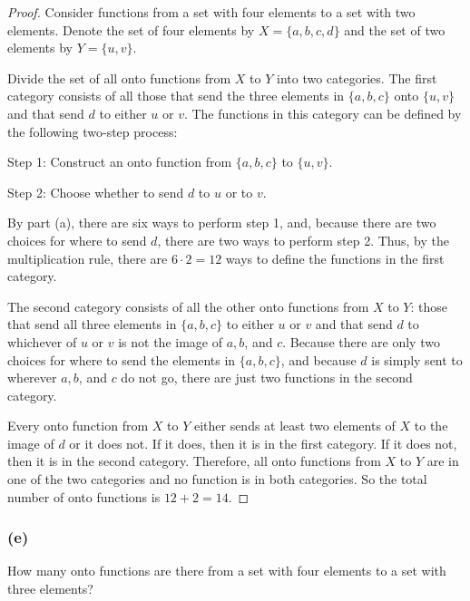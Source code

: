 \documentclass[14pt]{extarticle}
\newcommand{\cy}{\color{cyan}}
\begin{document}
\begin{proof}
     Consider functions from a set with four elements to a set with two elements. Denote the set of four elements by \(X =
     \{a, b, c, d\}\) and the set of two elements by \(Y = \{u, v\}\).

     Divide the set of all onto functions from \(X\) to \(Y\) into two categories. The first category consists of all those that
     send the three elements in \(\{a, b, c\}\) onto \(\{u, v\}\) and that send \(d\) to either \(u\) or \(v\). The functions in
     this category can be defined by the following two-step process:

     {\cy Step 1:} Construct an onto function from \(\{a, b, c\}\) to \(\{u, v\}\).

          {\cy Step 2:} Choose whether to send \(d\) to \(u\) or to \(v\).

     By part (a), there are six ways to perform step 1, and, because there are two choices for where to send \(d\), there
     are two ways to perform step 2. Thus, by the multiplication rule, there are \(6 \cdot 2 = 12\) ways to define the
     functions in the first category.

     The second category consists of all the other onto functions from \(X\) to \(Y\): those that send all three elements in
     \(\{a, b, c\}\) to either \(u\) or \(v\) and that send \(d\) to whichever of \(u\) or \(v\) is not the image of \(a, b\),
     and \(c\). Because there are only two choices for where to send the elements in \(\{a, b, c\}\), and because \(d\) is
     simply sent to wherever \(a, b\), and \(c\) do not go, there are just two functions in the second category.

     Every onto function from \(X\) to \(Y\) either sends at least two elements of \(X\) to the image of \(d\) or it does not. If
     it does, then it is in the first category. If it does not, then it is in the second category. Therefore, all onto
     functions from \(X\) to \(Y\) are in one of the two categories and no function is in both categories. So the total number of
     onto functions is \(12 + 2 = 14\).
\end{proof}

\subsubsection{(e)}
How many onto functions are there from a set with four elements to a set with three elements?
\end{document}
